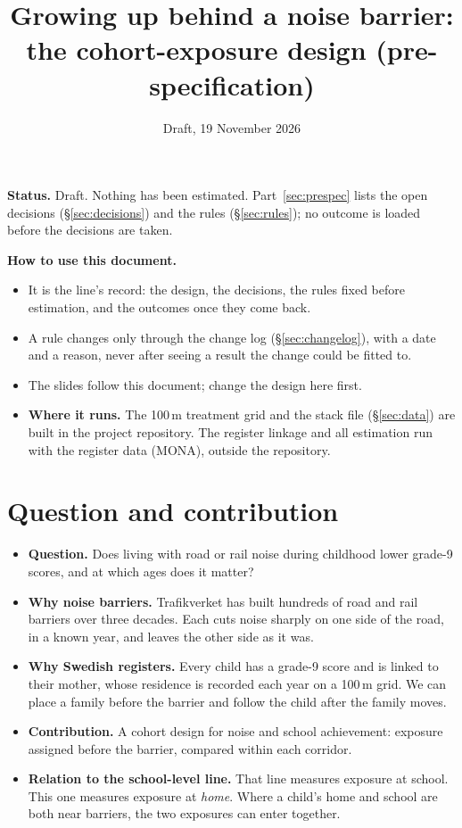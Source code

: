 \documentclass[11pt]{article}
\title{Growing up behind a noise barrier:\\ the cohort-exposure design (pre-specification)}
\author{}
\date{Draft, 19 November 2026}
\begin{document}
\maketitle

\noindent\textbf{Status.} Draft. Nothing has been estimated. Part~\ref{sec:prespec} lists the
open decisions (\S\ref{sec:decisions}) and the rules (\S\ref{sec:rules}); no outcome is loaded
before the decisions are taken.

\noindent\textbf{How to use this document.}
\begin{itemize}
\item It is the line's record: the design, the decisions, the rules fixed before estimation,
  and the outcomes once they come back.
\item A rule changes only through the change log (\S\ref{sec:changelog}), with a date and a
  reason, never after seeing a result the change could be fitted to.
\item The slides follow this document; change the design here first.
\item \textbf{Where it runs.} The 100\,m treatment grid and the stack file (\S\ref{sec:data})
  are built in the project repository. The register linkage and all estimation run with the
  register data (MONA), outside the repository.
\end{itemize}

\tableofcontents

\section{Question and contribution}

\begin{itemize}
\item \textbf{Question.} Does living with road or rail noise during childhood lower grade-9
  scores, and at which ages does it matter?
\item \textbf{Why noise barriers.} Trafikverket has built hundreds of road and rail barriers
  over three decades. Each cuts noise sharply on one side of the road, in a known year, and
  leaves the other side as it was.
\item \textbf{Why Swedish registers.} Every child has a grade-9 score and is linked to their
  mother, whose residence is recorded each year on a 100\,m grid. We can place a family before
  the barrier and follow the child after the family moves.
\item \textbf{Contribution.} A cohort design for noise and school achievement: exposure
  assigned before the barrier, compared within each corridor.
\item \textbf{Relation to the school-level line.} That line measures exposure at school. This
  one measures exposure at \emph{home}. Where a child's home and school are both near barriers,
  the two exposures can enter together.
\end{itemize}
\end{document}
